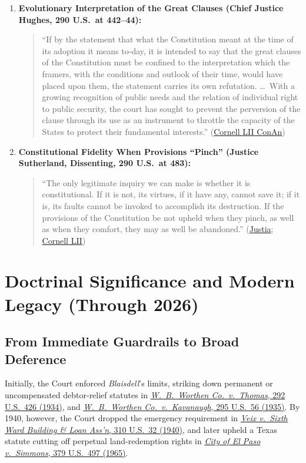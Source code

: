 \documentclass[12pt]{article}
\begin{document}
\begin{enumerate}
  \item \textbf{Evolutionary Interpretation of the Great Clauses (Chief Justice Hughes, 290 U.S.\ at 442--44):}
  \begin{quote}
    ``If by the statement that what the Constitution meant at the time of its adoption it means to-day, it is intended to say that the great clauses of the Constitution must be confined to the interpretation which the framers, with the conditions and outlook of their time, would have placed upon them, the statement carries its own refutation. \ldots\ With a growing recognition of public needs and the relation of individual right to public security, the court has sought to prevent the perversion of the clause through its use as an instrument to throttle the capacity of the States to protect their fundamental interests.'' (\href{https://www.law.cornell.edu/constitution-conan/article-1/section-10/clause-1/blaisdell-case-and-state-modifications-to-private-contracts}{Cornell LII ConAn})
  \end{quote}

  \item \textbf{Constitutional Fidelity When Provisions ``Pinch'' (Justice Sutherland, Dissenting, 290 U.S.\ at 483):}
  \begin{quote}
    ``The only legitimate inquiry we can make is whether it is constitutional. If it is not, its virtues, if it have any, cannot save it; if it is, its faults cannot be invoked to accomplish its destruction. If the provisions of the Constitution be not upheld when they pinch, as well as when they comfort, they may as well be abandoned.'' (\href{https://supreme.justia.com/cases/federal/us/290/398/}{Justia}; \href{https://www.law.cornell.edu/supremecourt/text/290/398}{Cornell LII})
  \end{quote}
\end{enumerate}

\section{Doctrinal Significance and Modern Legacy (Through 2026)}

\subsection{From Immediate Guardrails to Broad Deference}
Initially, the Court enforced \emph{Blaisdell}'s limits, striking down permanent or uncompensated debtor-relief statutes in \href{https://supreme.justia.com/cases/federal/us/292/426/}{\emph{W.\ B.\ Worthen Co.\ v.\ Thomas}, 292 U.S.\ 426 (1934)}, and \href{https://supreme.justia.com/cases/federal/us/295/56/}{\emph{W.\ B.\ Worthen Co.\ v.\ Kavanaugh}, 295 U.S.\ 56 (1935)}. By 1940, however, the Court dropped the emergency requirement in \href{https://supreme.justia.com/cases/federal/us/310/32/}{\emph{Veix v.\ Sixth Ward Building \& Loan Ass'n}, 310 U.S.\ 32 (1940)}, and later upheld a Texas statute cutting off perpetual land-redemption rights in \href{https://supreme.justia.com/cases/federal/us/379/497/}{\emph{City of El Paso v.\ Simmons}, 379 U.S.\ 497 (1965)}.
\end{document}
